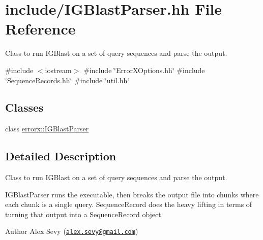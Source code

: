 \hypertarget{_i_g_blast_parser_8hh}{}\section{include/\+I\+G\+Blast\+Parser.hh File Reference}
\label{_i_g_blast_parser_8hh}


Class to run I\+G\+Blast on a set of query sequences and parse the output.  


{\ttfamily \#include $<$iostream$>$}\newline
{\ttfamily \#include \char`\"{}Error\+X\+Options.\+hh\char`\"{}}\newline
{\ttfamily \#include \char`\"{}Sequence\+Records.\+hh\char`\"{}}\newline
{\ttfamily \#include \char`\"{}util.\+hh\char`\"{}}\newline
\subsection*{Classes}
\begin{DoxyCompactItemize}
\item 
class \mbox{\hyperlink{classerrorx_1_1_i_g_blast_parser}{errorx\+::\+I\+G\+Blast\+Parser}}
\end{DoxyCompactItemize}


\subsection{Detailed Description}
Class to run I\+G\+Blast on a set of query sequences and parse the output. 

I\+G\+Blast\+Parser runs the executable, then breaks the output file into chunks where each chunk is a single query. Sequence\+Record does the heavy lifting in terms of turning that output into a Sequence\+Record object \begin{DoxyAuthor}{Author}
Alex Sevy (\href{mailto:alex.sevy@gmail.com}{\tt alex.\+sevy@gmail.\+com}) 
\end{DoxyAuthor}
